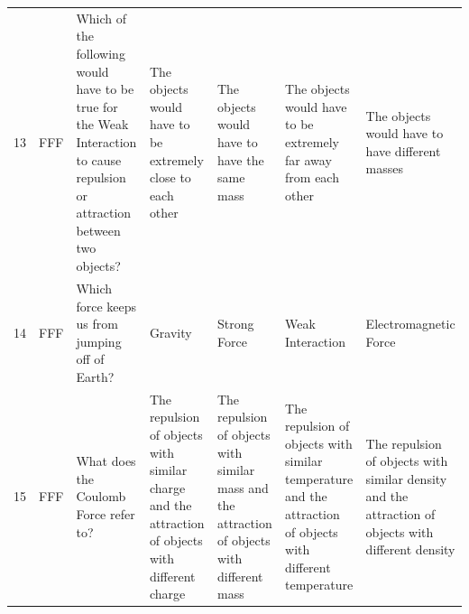 \documentclass[10pt]{article}
\begin{document}
\begin{tiny}
\begin{longtable}{r P{0.3in} P{1.203in} P{0.8in} P{0.8in} P{0.8in} P{0.8in}}
    13    &     FFF &                                                                                                                                                      Which of the following would have to be true for the Weak Interaction to cause repulsion or attraction between two objects? &                                                                            The objects would have to be extremely close to each other &                                                          The objects would have to have the same mass &                                                            The objects would have to be extremely far away from each other &                                                                                   The objects would have to have different masses \\
    14    &     FFF &                                                                                                                                                                                                                                  Which force keeps us from jumping off of Earth? &                                                                                                                               Gravity &                                                                                          Strong Force &                                                                                                           Weak Interaction &                                                                                                             Electromagnetic Force \\
    15    &     FFF &                                                                                                                                                                                                                                            What does the Coulomb Force refer to? &                                      The repulsion of objects with similar charge and the attraction of objects with different charge &          The repulsion of objects with similar mass and the attraction of objects with different mass &                 The repulsion of objects with similar temperature and the attraction of objects with different temperature &                                The repulsion of objects with similar density and the attraction of objects with different density \\

\end{longtable}
\end{tiny}
\end{document}
